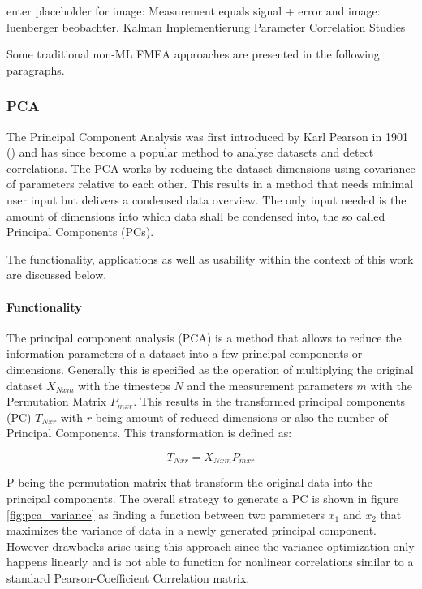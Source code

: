 enter placeholder for image: Measurement equals signal + error and image: luenberger beobachter. Kalman Implementierung \cite{lie_synthetic_2013}
Parameter Correlation Studies  \cite{li_simple_2015}

Some traditional non-ML FMEA approaches are presented in the following paragraphs.

\subsubsection{PCA}

The Principal Component Analysis was first introduced by Karl Pearson in 1901 (\cite{pearson_liii_1901}) and has since become a popular method to analyse datasets and detect correlations. The PCA works by reducing the dataset dimensions using covariance of parameters relative to each other. This results in a method that needs minimal user input but delivers a condensed data overview. The only input needed is the amount of dimensions into which data shall be condensed into, the so called Principal Components (PCs).

The functionality, applications as well as usability within the context of this work are discussed below.

\paragraph{Functionality}
The principal component analysis (PCA) is a method that allows to reduce the information parameters of a dataset into a few principal components or dimensions. Generally this is specified as the operation of multiplying the original dataset $X_{Nxm}$ with the timesteps $N$ and the measurement parameters $m$ with the Permutation Matrix $P_{mxr}$. This results in the transformed principal components (PC) $T_{Nxr}$ with $r$ being amount of reduced dimensions or also the number of Principal Components. This transformation is defined as:

$$T_{Nxr} = X_{Nxm}  P_{mxr}$$

P being the permutation matrix that transform the original data into the principal components. The overall strategy to generate a PC is shown in figure \ref{fig:pca_variance} as finding a function between two parameters $x_1$ and $x_2$ that maximizes the variance of data in a newly generated principal component. However drawbacks arise using this approach since the variance optimization only happens linearly and is not able to function for nonlinear correlations similar to a standard Pearson-Coefficient Correlation matrix. \cite{handl_multivariate_2017}

